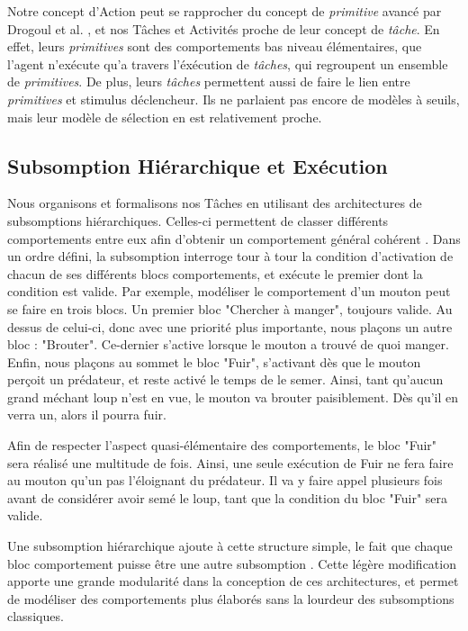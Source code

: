 			Notre concept d'Action peut se rapprocher du concept de \textit{primitive} avancé par Drogoul et al. \cite{drogoul_multi-agent_1992}, et nos Tâches et Activités proche de leur concept de \textit{tâche}. En effet, leurs \textit{primitives} sont des comportements bas niveau élémentaires, que l'agent n'exécute qu'a travers l'éxécution de \textit{tâches}, qui regroupent un ensemble de \textit{primitives}. De plus, leurs \textit{tâches} permettent aussi de faire le lien entre \textit{primitives} et stimulus déclencheur. Ils ne parlaient pas encore de modèles à seuils, mais leur modèle de sélection en est relativement proche.
			
		\subsection{Subsomption Hiérarchique et Exécution}
		
			Nous organisons et formalisons nos Tâches en utilisant des architectures de subsomptions hiérarchiques. Celles-ci permettent de classer différents comportements entre eux afin d'obtenir un comportement général cohérent \cite{brooks_robust_1986}. Dans un ordre défini, la subsomption interroge tour à tour la condition d'activation de chacun de ses différents blocs comportements, et exécute le premier dont la condition est valide. Par exemple, modéliser le comportement d'un mouton peut se faire en trois blocs. Un premier bloc "Chercher à manger", toujours valide. Au dessus de celui-ci, donc avec une priorité plus importante, nous plaçons un autre bloc : "Brouter". Ce-dernier s'active lorsque le mouton a trouvé de quoi manger. Enfin, nous plaçons au sommet le bloc "Fuir", s'activant dès que le mouton perçoit un prédateur, et reste activé le temps de le semer. Ainsi, tant qu'aucun grand méchant loup n'est en vue, le mouton va brouter paisiblement. Dès qu'il en verra un, alors il pourra fuir.
			
			Afin de respecter l'aspect quasi-élémentaire des comportements, le bloc "Fuir" sera réalisé une multitude de fois. Ainsi, une seule exécution de Fuir ne fera faire au mouton qu'un pas l'éloignant du prédateur. Il va y faire appel plusieurs fois avant de considérer avoir semé le loup, tant que la condition du bloc "Fuir" sera valide.
			
			Une subsomption hiérarchique ajoute à cette structure simple, le fait que chaque bloc comportement puisse être une autre subsomption \cite{heckel_representational_2010}. Cette légère modification apporte une grande modularité dans la conception de ces architectures, et permet de modéliser des comportements plus élaborés sans la lourdeur des subsomptions classiques.
			
